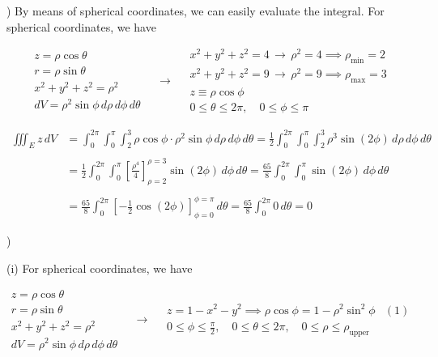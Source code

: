 \documentclass{article}
\begin{document}
\hfill

) By means of spherical coordinates, we can easily evaluate the integral. For spherical coordinates, we have

\[
\begin{array}{c}
z=\rho\cos\theta\\
r=\rho\sin\theta\\
x^2+y^2+z^2=\rho^2\\
dV=\rho^2\sin\phi\,d\rho\,d\phi\,d\theta
\end{array}\quad\rightarrow\quad
\begin{array}{c}
x^2+y^2+z^2=4\,\rightarrow\,\rho^2 = 4\implies \rho_{\text{min}}=2\\
x^2+y^2+z^2=9\,\rightarrow\,\rho^2 = 9\implies \rho_{\text{max}}=3\\
z\equiv\rho\cos\phi\\
0\leq\theta\leq2\pi,\quad0\leq\phi\leq\pi
\end{array}
\]

\begin{align*}
\iiint_Ez\,dV&=\int_0^{2\pi}\int_0^\pi\int_2^3\rho\cos\phi\cdot\rho^2\sin\phi\,d\rho\,d\phi\,d\theta=\frac12\int_0^{2\pi}\int_0^\pi\int_2^3\rho^3\sin(2\phi)\,d\rho\,d\phi\,d\theta\\\\&=\frac12\int_0^{2\pi}\int_0^\pi\left[\frac{\rho^4}{4}\right]_{\rho=2}^{\rho=3}\sin(2\phi)\,d\phi\,d\theta=\frac{65}{8}\int_0^{2\pi}\int_0^\pi\sin(2\phi)\,d\phi\,d\theta\\\\&=\frac{65}{8}\int_0^{2\pi}\left[-\frac12\cos(2\phi)\right]_{\phi=0}^{\phi=\pi}\,d\theta=\frac{65}{8}\int_0^{2\pi}0\,d\theta =\boxed0
\end{align*}

\newpage

)

\hfill

\noindent (i) For spherical coordinates, we have

\[
\begin{array}{c}
z=\rho\cos\theta\\
r=\rho\sin\theta\\
x^2+y^2+z^2=\rho^2\\
dV=\rho^2\sin\phi\,d\rho\,d\phi\,d\theta
\end{array}\quad\rightarrow\quad
\begin{array}{cc}
z=1-x^2-y^2\implies\rho\cos\phi=1-\rho^2\sin^2\phi&(1)\\[0.3cm]
\displaystyle0\leq\phi\leq\frac\pi2,\quad0\leq\theta\leq2\pi,\quad0\leq\rho\leq\rho_{\text{upper}}
\end{array}
\]
\end{document}
